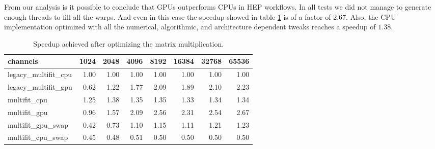 From our analysis is it possible to conclude that GPUs outperforms CPUs in HEP workflows. In all tests we did not manage to generate enough threads to fill all the warps. And even in this case the speedup showed in table \ref{tab:speedup} is of a factor of $2.67$. Also, the CPU implementation optimized with all the numerical, algorithmic, and architecture dependent tweaks reaches a speedup of $1.38$.  
\begin{table}[h]
  \caption{Speedup achieved after optimizing the matrix multiplication.}
  \label{tab:speedup}
\begin{tabular}{lrrrrrrr}
\toprule
channels &  1024  &  2048  &  4096  &  8192  &  16384 &  32768 &  65536 \\
\midrule
legacy\_multifit\_cpu &   1.00 &   1.00 &   1.00 &   1.00 &   1.00 &   1.00 &   1.00 \\
legacy\_multifit\_gpu &   0.62 &   1.22 &   1.77 &   2.09 &   1.89 &   2.10 &   2.23 \\
multifit\_cpu        &   1.25 &   1.38 &   1.35 &   1.35 &   1.33 &   1.34 &   1.34 \\
multifit\_gpu        &   0.96 &   1.57 &   2.09 &   2.56 &   2.31 &   2.54 &   2.67 \\
multifit\_gpu\_swap   &   0.42 &   0.73 &   1.10 &   1.15 &   1.11 &   1.21 &   1.23 \\
multifit\_cpu\_swap   &   0.45 &   0.48 &   0.51 &   0.50 &   0.50 &   0.50 &   0.50 \\
\bottomrule
\end{tabular}
\end{table}
